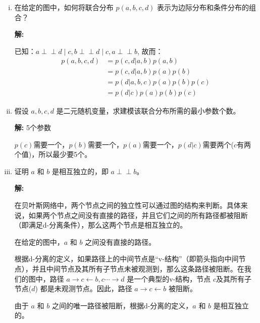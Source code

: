 \documentclass[8pt]{article}
\begin{document}
    \begin{enumerate}[(i)]
        \item 

        在给定的图中，如何将联合分布 $p(a, b, c, d)$ 表示为边际分布和条件分布的组合？
        
        \textbf{\large 解:}

        已知：$a \perp\!\!\!\perp d \mid c, b \perp\!\!\!\perp d \mid c, a \perp\!\!\!\perp b$, 故而：
        \begin{align*}
            p(a,b,c,d) 
            &=p(c,d|a,b)p(a,b) \\
            &= p(c,d|a,b)p(a)p(b)\\
            &= p(d|a,b,c)p(a)p(b)p(c) \\
            &= p(d|c)p(a)p(b)p(c)
        \end{align*}
        \vspace{1em}

        \item 

        假设 $a, b, c, d$ 是二元随机变量，求建模该联合分布所需的最小参数个数。
        
        \textbf{\large 解:} 5个参数
        
        $p(c)$需要一个，$p(b)$需要一个，$p(a)$需要一个，$p(d|c)$需要两个($c$有两个值)，所以最少要5个。
        \vspace{1em}

        \item 
        
        证明 $a$ 和 $b$ 是相互独立的，即 \(a \perp\!\!\!\perp b\)。
        
        \textbf{\large 解:}

        在贝叶斯网络中，两个节点之间的独立性可以通过图的结构来判断。具体来说，如果两个节点之间没有直接的路径，并且它们之间的所有路径都被阻断（即满足d-分离条件），那么这两个节点是相互独立的。

        在给定的图中，$a$ 和 $b$ 之间没有直接的路径。
        
        根据d-分离的定义，如果路径上的中间节点是“v-结构”（即箭头指向中间节点），并且中间节点及其所有子节点未被观测到，那么这条路径被阻断。在我们的图中，路径 $a \rightarrow c \leftarrow b, c \cdots \rightarrow d$ 是一个典型的v-结构，节点 $c$及其所有子节点({$d$}) 都是未观测节点。因此，路径 $a \rightarrow c \leftarrow b$ 被阻断。
        
        由于 $a$ 和 $b$ 之间的唯一路径被阻断，根据d-分离的定义，$a$ 和 $b$ 是相互独立的。


\end{enumerate}
\end{document}

